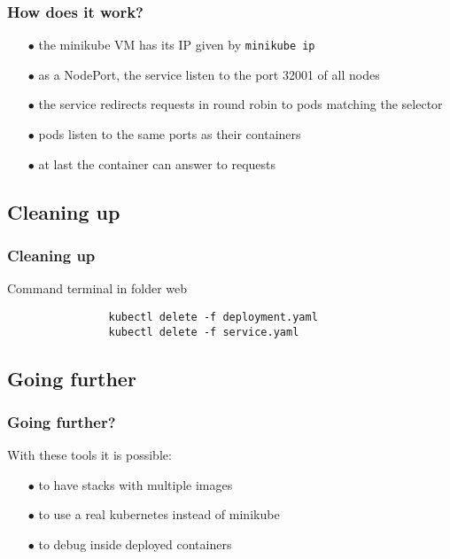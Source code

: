 	\begin{frame}[fragile]
		\frametitle{How does it work?}
		
		\begin{itemize}
			\item[$\bullet$] the minikube VM has its IP given by \verb!minikube ip!
			\item[$\bullet$] as a NodePort, the service listen to the port 32001 of all nodes
			\item[$\bullet$] the service redirects requests in round robin to pods matching the selector
			\item[$\bullet$] pods listen to the same ports as their containers
			\item[$\bullet$] at last the container can answer to requests
		\end{itemize}
	\end{frame}
	
\subsection{Cleaning up}

	\begin{frame}[fragile]
		\frametitle{Cleaning up}
		
		\begin{block}{Command terminal in folder web}
			\begin{verbatim}
				kubectl delete -f deployment.yaml
				kubectl delete -f service.yaml
			\end{verbatim}
		\end{block}
	\end{frame}
	
\subsection{Going further}
	\begin{frame}
		\frametitle{Going further?}
		
		With these tools it is possible:
		\begin{itemize}
			\item[$\bullet$] to have stacks with multiple images
			\item[$\bullet$] to use a real kubernetes instead of minikube
			\item[$\bullet$] to debug inside deployed containers
		\end{itemize}
	\end{frame}
	
